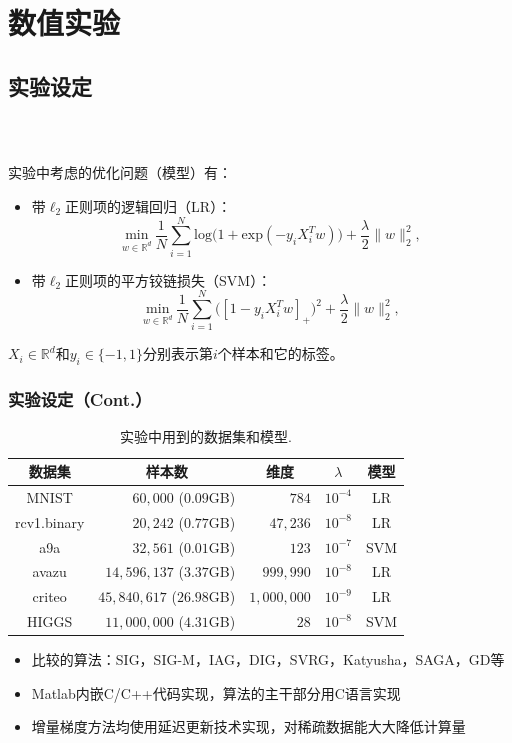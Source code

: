 \section{数值实验}
\subsection{实验设定}

  \frame
  {
    \frametitle{\subsecname~ }
    \footnotesize
    实验中考虑的优化问题（模型）有：
    \begin{itemize}
        \item 带$\ell_2$正则项的逻辑回归（LR）：
        $$
          \underset{w \in \mathbb{R}^d}{\mathrm{min}} \ \frac{1}{N} \sum_{i=1}^{N}
          \mathrm{log}\big( 1 + \mathrm{exp}(-y_i X_i^T w) \big) + \frac{\lambda}{2} \|w\|_2^2,
        $$
        \item 带$\ell_2$正则项的平方铰链损失（SVM）：
        $$
           \underset{w \in \mathbb{R}^d}{\mathrm{min}} \ \frac{1}{N} \sum_{i=1}^{N}
           \big( [1 - y_i X_i^T w]_{+} \big)^2 + \frac{\lambda}{2} \|w\|_2^2,
        $$
    \end{itemize}
    $X_i \in \mathbb{R}^d$和$y_i \in \{ -1, 1\}$分别表示第$i$个样本和它的标签。
  }

  \frame
  {
    \frametitle{实验设定（Cont.）}
    \footnotesize
    \begin{table}[H]
      \centering
      \caption{实验中用到的数据集和模型{\color{white}.}} \label{tb:dataset}
      \begin{tabular}{|c|r|r|c|c|}
        \hline
        数据集          & \multicolumn{1}{c|}{样本数}       & \multicolumn{1}{c|}{维度} & $\lambda$   & 模型 \\ \hline
        MNIST          & $60,000$ ($0.09$GB)              & $784$                  & $10^{-4}$     & LR \\
        rcv1.binary    & $20,242$ ($0.77$GB)              & $47,236$               & $10^{-8}$     & LR  \\
        a9a            & $32,561$ ($0.01$GB)              & $123$                  & $10^{-7}$     & SVM  \\
        avazu          & $14,596,137$ ($3.37$GB)          & $999,990$              & $10^{-8}$     & LR  \\
        criteo         & $45,840,617$ ($26.98$GB)         & $1,000,000$            & $10^{-9}$     & LR  \\
        HIGGS          & $11,000,000$ ($4.31$GB)          & $28$                   & $10^{-8}$     & SVM  \\
        \hline
      \end{tabular}
    \end{table}

\pause

    \begin{itemize}
        \item 比较的算法：SIG，SIG-M，IAG，DIG，SVRG，Katyusha，SAGA，GD等
        \item Matlab内嵌C/C++代码实现，算法的主干部分用C语言实现
        \item 增量梯度方法均使用延迟更新技术实现，对稀疏数据能大大降低计算量
    \end{itemize}
  }


